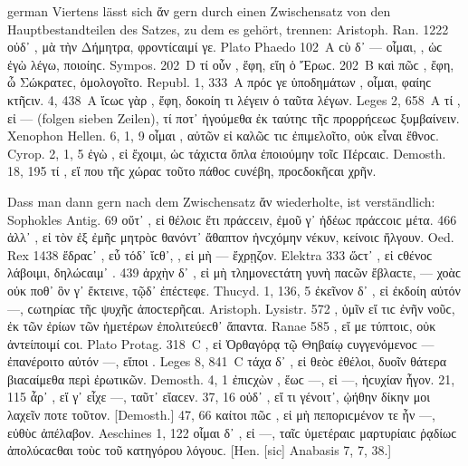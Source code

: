 \begin{otherlanguage*}{german}
Viertens lässt sich ἄν gern durch einen Zwischensatz von den Hauptbestandteilen des Satzes, zu dem es gehört, trennen: Aristoph. Ran. 1222 οὐδ᾽ , μὰ τὴν Δήμητρα, φροντίϲαιμί γε. Plato Phaedo 102~A ϲὺ δ᾽ — οἶμαι, , ὡϲ ἐγὼ λέγω, ποιοίηϲ. Sympos. 202~D τί οὖν , ἔφη, εἴη ὁ Ἔρωϲ. 202~Β καὶ πῶϲ , ἔφη, ὦ Σώκρατεϲ, ὁμολογοῖτο. Republ. 1, 333~Α πρόϲ γε ὑποδημάτων , οἶμαι, φαίηϲ κτῆϲιν. 4, 438~A ἴϲωϲ γὰρ , ἔφη, δοκοίη τι λέγειν ὁ ταῦτα λέγων. Leges 2, 658~Α τί , εἰ — (folgen sieben Zeilen), τί ποτ᾽  ἡγούμεθα ἐκ ταύτηϲ τῆϲ προρρήϲεωϲ ξυμβαίνειν. Xenophon Hellen. 6, 1, 9 οἶμαι , αὐτῶν εἰ καλῶϲ τιϲ ἐπιμελοῖτο, οὐκ εἶναι ἔθνοϲ. Cyrop. 2, 1, 5 ἐγὼ , εἰ ἔχοιμι, ὡϲ τάχιϲτα ὅπλα ἐποιούμην τοῖϲ Πέρϲαιϲ. Demosth. 18, 195 τί , εἴ που τῆϲ χώραϲ τοῦτο πάθοϲ ϲυνέβη, προϲδοκῆϲαι χρῆν.

Dass man dann gern nach dem Zwischensatz ἄν wiederholte, ist verständlich: Sophokles Antig. 69 οὔτ᾽ , εἰ θέλοιϲ ἔτι πράϲϲειν, ἐμοῦ γ᾽  ἡδέωϲ πράϲϲοιϲ μέτα. 466 ἀλλ᾽ , εἰ τὸν ἐξ ἐμῆϲ μητρὸϲ θανόντ᾽ ἄθαπτον ἠνϲχόμην νέκυν, κείνοιϲ  ἤλγουν. Oed. Rex 1438 ἔδραϲ᾽ , εὖ τόδ᾽ ἴϲθ᾽, , εἰ μὴ — ἔχρῃζον. Elektra 333 ὥϲτ᾽ , εἰ ϲθένοϲ λάβοιμι, δηλώϲαιμ᾽ . 439 ἀρχὴν δ᾽ , εἰ μὴ τλημονεϲτάτη γυνὴ παϲῶν ἔβλαϲτε, — χοὰϲ οὐκ  ποθ᾽ ὃν γ᾽ ἔκτεινε, τῷδ᾽ ἐπέϲτεφε. Thucyd. 1, 136, 5 ἐκεῖνον δ᾽ , εἰ ἐκδοίη αὐτόν —, ϲωτηρίαϲ  τῆϲ ψυχῆϲ ἀποϲτερῆϲαι. Aristoph. Lysistr. 572 , ὑμῖν εἴ τιϲ ἐνῆν νοῦϲ, ἐκ τῶν ἐρίων τῶν ἡμετέρων ἐπολιτεύεϲθ᾽  ἅπαντα. Ranae 585 , εἴ με τύπτοιϲ, οὐκ  ἀντείποιμί ϲοι. Plato Protag. 318~C , εἰ Ὀρθαγόρᾳ τῷ Θηβαίῳ ϲυγ\-γε\-νό\-μενοϲ — ἐπανέροιτο αὐτόν —, εἴποι . Leges 8, 841~C τάχα δ᾽ , εἰ θεὸϲ ἐθέλοι,  δυοῖν θάτερα βιαϲαίμεθα περὶ ἐρωτικῶν. Demosth. 4, 1 ἐπιϲχὼν , ἕωϲ —, εἰ —, ἡϲυχίαν  ἦγον. 21, 115 ἆρ᾽ , εἴ γ᾽ εἶχε —, ταῦτ᾽  εἴαϲεν. 37, 16 οὐδ᾽ , εἴ τι γένοιτ᾽, ᾠήθην  δίκην μοι λαχεῖν ποτε τοῦτον. [Demosth.] 47, 66 καίτοι πῶϲ , εἰ μὴ πεποριϲμένον τε ἦν —, εὐθὺϲ  ἀπέλαβον. Aeschines 1, 122 οἶμαι δ᾽ , εἰ —, ταῖϲ ὑμετέραιϲ μαρτυρίαιϲ ῥᾳδίωϲ  ἀπολύϲαϲθαι τοὺϲ τοῦ κατηγόρου λόγουϲ. [Hen. [sic] Anabasis 7, 7, 38.]


\end{otherlanguage*}
